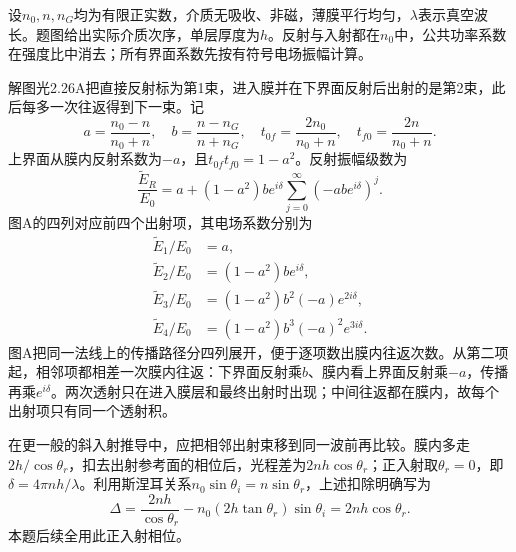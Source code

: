 \documentclass[UTF8,fontset=fandol,a4paper,11pt]{ctexart}
\begin{document}
设$n_0,n,n_G$均为有限正实数，介质无吸收、非磁，薄膜平行均匀，$\lambda$表示真空波长。题图给出实际介质次序，单层厚度为$h$。反射与入射都在$n_0$中，公共功率系数在强度比中消去；所有界面系数先按有符号电场振幅计算。

解图光2.26A把直接反射标为第1束，进入膜并在下界面反射后出射的是第2束，此后每多一次往返得到下一束。记
\[
a=\frac{n_0-n}{n_0+n},\quad b=\frac{n-n_G}{n+n_G},\quad
t_{0f}=\frac{2n_0}{n_0+n},\quad t_{f0}=\frac{2n}{n_0+n}.
\]
上界面从膜内反射系数为$-a$，且$t_{0f}t_{f0}=1-a^2$。反射振幅级数为
\[
\frac{\widetilde E_R}{E_0}
=a+(1-a^2)b e^{i\delta}
\sum_{j=0}^{\infty}(-ab e^{i\delta})^j.
\]
图A的四列对应前四个出射项，其电场系数分别为
\[
\begin{aligned}
\widetilde E_1/E_0&=a,\\
\widetilde E_2/E_0&=(1-a^2)b e^{i\delta},\\
\widetilde E_3/E_0&=(1-a^2)b^2(-a)e^{2i\delta},\\
\widetilde E_4/E_0&=(1-a^2)b^3(-a)^2e^{3i\delta}.
\end{aligned}
\]
图A把同一法线上的传播路径分四列展开，便于逐项数出膜内往返次数。从第二项起，相邻项都相差一次膜内往返：下界面反射乘$b$、膜内看上界面反射乘$-a$，传播再乘$e^{i\delta}$。两次透射只在进入膜层和最终出射时出现；中间往返都在膜内，故每个出射项只有同一个透射积。

在更一般的斜入射推导中，应把相邻出射束移到同一波前再比较。膜内多走$2h/\cos\theta_r$，扣去出射参考面的相位后，光程差为$2nh\cos\theta_r$；正入射取$\theta_r=0$，即$\delta=4\pi nh/\lambda$。利用斯涅耳关系$n_0\sin\theta_i=n\sin\theta_r$，上述扣除明确写为
\[
\Delta=\frac{2nh}{\cos\theta_r}
-n_0(2h\tan\theta_r)\sin\theta_i
=2nh\cos\theta_r .
\]
本题后续全用此正入射相位。
\end{document}
